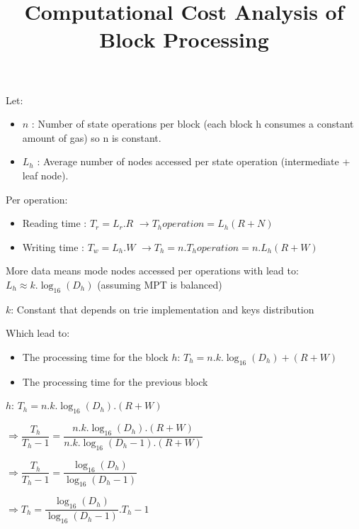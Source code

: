 \documentclass{article}
\title{Computational Cost Analysis of Block Processing}
\date{}
\begin{document}
\maketitle

Let:
\begin{itemize}
    \item ${n}$ : Number of state operations per block (each block h consumes a constant amount of gas) so n is constant.
    \item ${L_h}$ : Average number of nodes accessed per state operation (intermediate + leaf node).
\end{itemize}

Per operation:
\begin{itemize}
    \item Reading time : ${T_r = L_r . R}$ $\rightarrow{}$${T_hoperation = L_h(R+N)}$
    \item Writing time :  ${T_w = L_h . W}$ $\rightarrow{}$${T_h = n.T_hoperation = n.L_h(R+W)}$
\end{itemize}

More data means mode nodes accessed per operations with lead to:
${L_h \approx k .\log_{16} (D_h)}$ (assuming MPT is balanced)

${k}$: Constant that depends on trie implementation and keys distribution

Which lead to:

\centering{}

\begin{itemize}
    \item The processing time for the block ${h}$: ${T_h = n.k.\log_{16}(D_h) + (R + W)}$

    \item The processing time for the previous block 
\end{itemize}

${h}$: ${T_h = n.k.\log_{16}(D_h) . (R + W)}$

$\Rightarrow \dfrac{T_h}{T_h-1} = \dfrac{n.k.\log_{16}(D_h) . (R + W)}{n.k.\log_{16}(D_h-1) . (R + W)}$

$\Rightarrow \dfrac{T_h}{T_h-1} = \dfrac{\log_{16}(D_h) }{\log_{16}(D_h-1) }$

$\Rightarrow {T_h} = \dfrac{\log_{16}(D_h) }{\log_{16}(D_h-1) }{.{T_h-1}}$
\end{document}
